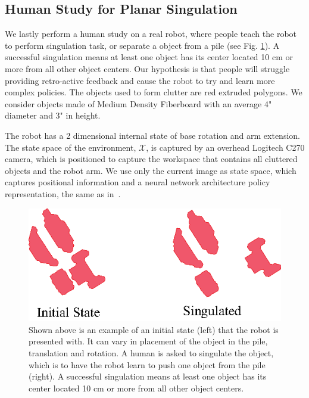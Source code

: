 \documentclass[10pt, conference]{ieeeconf}      %
\begin{document}
\subsection{Human Study for Planar Singulation}
We lastly perform a human study on a real robot, where people teach the robot to perform singulation task, or separate a object from a pile (see Fig. \ref{fig:izzy_sing}). A successful singulation means at least one object has its center located 10 cm or more from all other object centers. Our hypothesis is that people will struggle providing retro-active feedback and cause the robot to try and learn more complex policies.  The objects used to form clutter are red extruded polygons. We consider objects made of Medium Density Fiberboard with an average 4" diameter and 3" in height. 

The robot has a 2 dimensional internal state of base rotation and arm extension. The state space of the environment, $\mathcal{X}$, is captured by  an overhead Logitech C270 camera, which is positioned to capture the workspace that contains all cluttered objects and the robot arm. We use only the current image as state space, which captures positional information and a neural network architecture policy representation, the same as in~\cite{laskeyrobot}.

\begin{figure}
\centering
\includegraphics{f_figs/singulation.eps}
\caption{
    \footnotesize
Shown above is an example of an initial state (left) that the robot is presented with. It can vary in placement of the object in the pile, translation and rotation. A human is asked to singulate the object, which is to have the robot learn to push one object from the pile (right). A successful singulation means at least one object has its center located 10 cm or more from all other object centers.   }

\label{fig:izzy_sing}
\end{figure}
\end{document}
